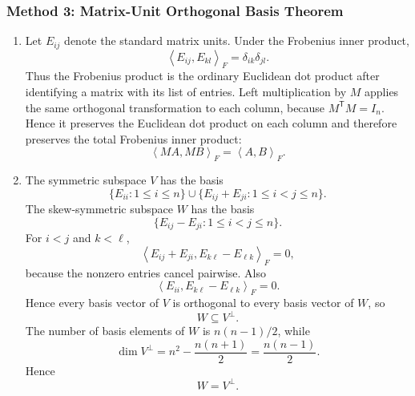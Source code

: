\documentclass[12pt]{article}
\newcommand{\ipF}[2]{\left\langle #1,#2\right\rangle_F}
\newcommand{\T}{\mathsf{T}}
\begin{document}
\subsubsection{Method 3: Matrix-Unit Orthogonal Basis Theorem}
\begin{enumerate}[label=(\alph*)]
  \item Let $E_{ij}$ denote the standard matrix units. Under the Frobenius inner product,
  \[
    \ipF{E_{ij}}{E_{kl}}=\delta_{ik}\delta_{jl}.
  \]
  Thus the Frobenius product is the ordinary Euclidean dot product after identifying a matrix with its list of entries. Left multiplication by $M$ applies the same orthogonal transformation to each column, because $M^\T M=I_n$. Hence it preserves the Euclidean dot product on each column and therefore preserves the total Frobenius inner product:
  \[
    \boxed{\ipF{MA}{MB}=\ipF{A}{B}.}
  \]

  \item The symmetric subspace $V$ has the basis
  \[
    \{E_{ii}:1\le i\le n\}
    \cup
    \{E_{ij}+E_{ji}:1\le i<j\le n\}.
  \]
  The skew-symmetric subspace $W$ has the basis
  \[
    \{E_{ij}-E_{ji}:1\le i<j\le n\}.
  \]
  For $i<j$ and $k<\ell$,
  \[
    \ipF{E_{ij}+E_{ji}}{E_{k\ell}-E_{\ell k}}=0,
  \]
  because the nonzero entries cancel pairwise. Also
  \[
    \ipF{E_{ii}}{E_{k\ell}-E_{\ell k}}=0.
  \]
  Hence every basis vector of $V$ is orthogonal to every basis vector of $W$, so
  \[
    W\subseteq V^\perp.
  \]
  The number of basis elements of $W$ is $n(n-1)/2$, while
  \[
    \dim V^\perp=n^2-\frac{n(n+1)}2=\frac{n(n-1)}2.
  \]
  Hence
  \[
    \boxed{W=V^\perp.}
  \]
\end{enumerate}

\newpage
\end{document}
